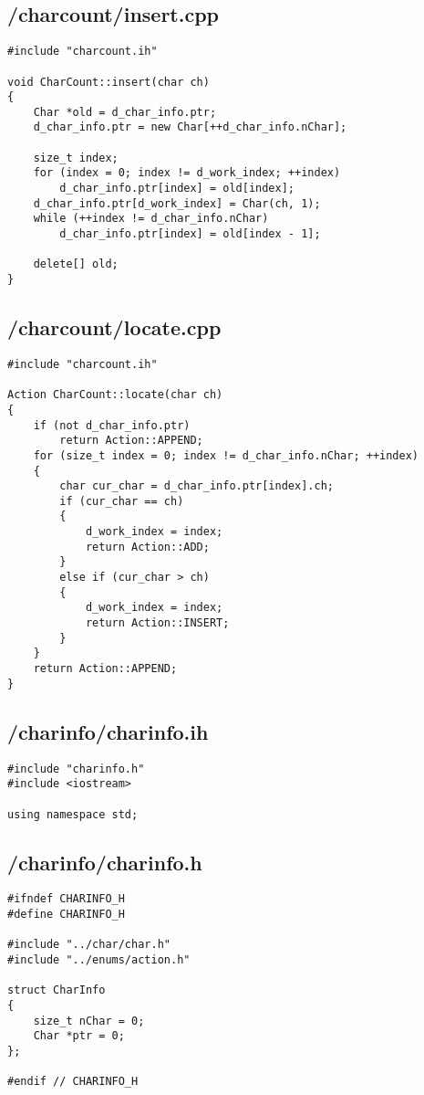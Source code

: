 \documentclass{article}
\begin{document}
\subsection*{/charcount/insert.cpp}
\begin{verbatim}
#include "charcount.ih"

void CharCount::insert(char ch)
{
    Char *old = d_char_info.ptr;
    d_char_info.ptr = new Char[++d_char_info.nChar];

    size_t index;
    for (index = 0; index != d_work_index; ++index)
        d_char_info.ptr[index] = old[index];
    d_char_info.ptr[d_work_index] = Char(ch, 1);
    while (++index != d_char_info.nChar)
        d_char_info.ptr[index] = old[index - 1];

    delete[] old;
}
\end{verbatim}
\subsection*{/charcount/locate.cpp}
\begin{verbatim}
#include "charcount.ih"

Action CharCount::locate(char ch)
{
    if (not d_char_info.ptr)
        return Action::APPEND;
    for (size_t index = 0; index != d_char_info.nChar; ++index)
    {
        char cur_char = d_char_info.ptr[index].ch;
        if (cur_char == ch)
        {
            d_work_index = index;
            return Action::ADD;
        }
        else if (cur_char > ch)
        {
            d_work_index = index;
            return Action::INSERT;
        }
    }
    return Action::APPEND;
}
\end{verbatim}

\subsection*{/charinfo/charinfo.ih}
\begin{verbatim}
#include "charinfo.h"
#include <iostream>

using namespace std;

\end{verbatim}
\subsection*{/charinfo/charinfo.h}
\begin{verbatim}
#ifndef CHARINFO_H
#define CHARINFO_H

#include "../char/char.h"
#include "../enums/action.h"

struct CharInfo 
{
    size_t nChar = 0;
    Char *ptr = 0;
};

#endif // CHARINFO_H
\end{verbatim}
\end{document}

